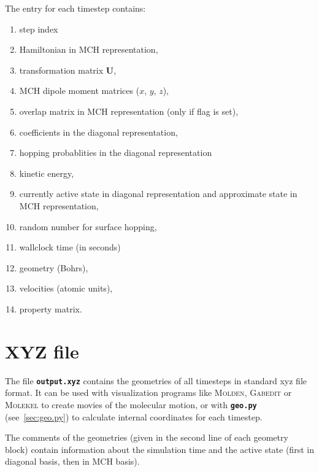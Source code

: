 \documentclass[a4paper,11pt,DIV=15,openany,twoside=false]{scrbook}
\newcommand{\ttt}[1]{\textbf{\texttt{#1}}}
\newcommand{\VEC}[1]{\ensuremath{\mathbf{#1}}}
\begin{document}
The entry for each timestep contains:
\begin{enumerate}
  \item step index
  \item Hamiltonian in MCH representation,
  \item transformation matrix $\VEC{U}$,
  \item MCH dipole moment matrices ($x$, $y$, $z$),
  \item overlap matrix in MCH representation (only if flag is set),
  \item coefficients in the diagonal representation,
  \item hopping probablities in the diagonal representation
  \item kinetic energy,
  \item currently active state in diagonal representation and approximate state in MCH representation,
  \item random number for surface hopping,
  \item wallclock time (in seconds)
  \item geometry (Bohrs),
  \item velocities (atomic units),
  \item property matrix.
\end{enumerate}

\section{XYZ file}\label{sec:xyzfile}

The file \ttt{output.xyz} contains the geometries of all timesteps in standard xyz file format. It can be used with visualization programs like \textsc{Molden}, \textsc{Gabedit} or \textsc{Molekel} to create movies of the molecular motion, or with \ttt{geo.py} (see~\ref{sec:geo.py}) to calculate internal coordinates for each timestep.

The comments of the geometries (given in the second line of each geometry block) contain information about the simulation time and the active state (first in diagonal basis, then in MCH basis).


\end{document}
